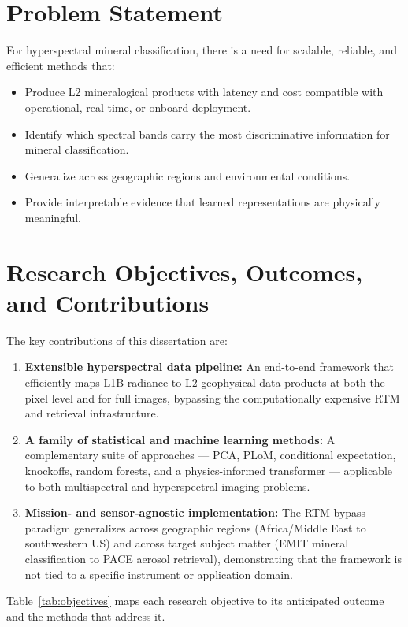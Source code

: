 \documentclass[11pt]{report}
\begin{document}
\section{Problem Statement}

For hyperspectral mineral classification, there is a need for scalable, reliable, and efficient methods that:
\begin{itemize}
  \item Produce L2 mineralogical products with latency and cost compatible with operational, real-time, or onboard deployment.
  \item Identify which spectral bands carry the most discriminative information for mineral classification.
  \item Generalize across geographic regions and environmental conditions.
  \item Provide interpretable evidence that learned representations are physically meaningful.
\end{itemize}

\section{Research Objectives, Outcomes, and Contributions}

The key contributions of this dissertation are:
\begin{enumerate}
  \item \textbf{Extensible hyperspectral data pipeline:} An end-to-end framework that efficiently maps L1B radiance to L2 geophysical data products at both the pixel level and for full images, bypassing the computationally expensive RTM and retrieval infrastructure.
  \item \textbf{A family of statistical and machine learning methods:} A complementary suite of approaches --- PCA, PLoM, conditional expectation, knockoffs, random forests, and a physics-informed transformer --- applicable to both multispectral and hyperspectral imaging problems.
  \item \textbf{Mission- and sensor-agnostic implementation:} The RTM-bypass paradigm generalizes across geographic regions (Africa/Middle East to southwestern US) and across target subject matter (EMIT mineral classification to PACE aerosol retrieval), demonstrating that the framework is not tied to a specific instrument or application domain.
\end{enumerate}

Table~\ref{tab:objectives} maps each research objective to its anticipated outcome and the methods that address it.
\end{document}

